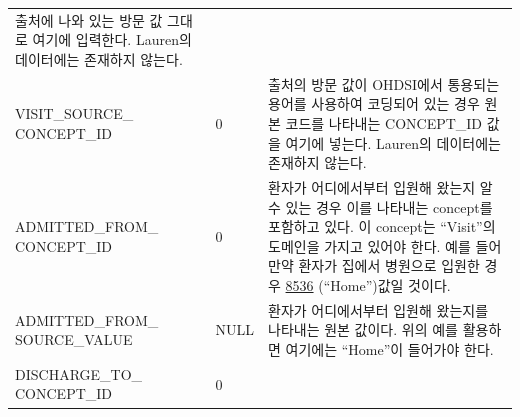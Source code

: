 \documentclass[11pt]{book}
\theoremstyle{definition}
\theoremstyle{definition}
\theoremstyle{definition}
\theoremstyle{remark}
\begin{document}
\begin{longtable}[]{@{}lll@{}}
\begin{minipage}[t]{0.48\columnwidth}
출처에 나와 있는 방문 값 그대로 여기에 입력한다. Lauren의 데이터에는
존재하지 않는다.\strut
\end{minipage}\tabularnewline
\begin{minipage}[t]{0.28\columnwidth}\raggedright\strut
VISIT\_SOURCE\_ CONCEPT\_ID\strut
\end{minipage} & \begin{minipage}[t]{0.16\columnwidth}\raggedright\strut
0\strut
\end{minipage} & \begin{minipage}[t]{0.48\columnwidth}\raggedright\strut
출처의 방문 값이 OHDSI에서 통용되는 용어를 사용하여 코딩되어 있는 경우
원본 코드를 나타내는 CONCEPT\_ID 값을 여기에 넣는다. Lauren의 데이터에는
존재하지 않는다.\strut
\end{minipage}\tabularnewline
\begin{minipage}[t]{0.28\columnwidth}\raggedright\strut
ADMITTED\_FROM\_ CONCEPT\_ID\strut
\end{minipage} & \begin{minipage}[t]{0.16\columnwidth}\raggedright\strut
0\strut
\end{minipage} & \begin{minipage}[t]{0.48\columnwidth}\raggedright\strut
환자가 어디에서부터 입원해 왔는지 알 수 있는 경우 이를 나타내는
concept를 포함하고 있다. 이 concept는 ``Visit''의 도메인을 가지고 있어야
한다. 예를 들어 만약 환자가 집에서 병원으로 입원한 경우
\href{http://athena.ohdsi.org/search-terms/terms/8536}{8536}
(``Home'')값일 것이다.\strut
\end{minipage}\tabularnewline
\begin{minipage}[t]{0.28\columnwidth}\raggedright\strut
ADMITTED\_FROM\_ SOURCE\_VALUE\strut
\end{minipage} & \begin{minipage}[t]{0.16\columnwidth}\raggedright\strut
NULL\strut
\end{minipage} & \begin{minipage}[t]{0.48\columnwidth}\raggedright\strut
환자가 어디에서부터 입원해 왔는지를 나타내는 원본 값이다. 위의 예를
활용하면 여기에는 ``Home''이 들어가야 한다.\strut
\end{minipage}\tabularnewline
\begin{minipage}[t]{0.28\columnwidth}\raggedright\strut
DISCHARGE\_TO\_ CONCEPT\_ID\strut
\end{minipage} & \begin{minipage}[t]{0.16\columnwidth}\raggedright\strut
0\strut
\end{minipage} & \begin{minipage}[t]{0.48\columnwidth}\raggedright\strut

\end{minipage}
\end{longtable}
\end{document}
